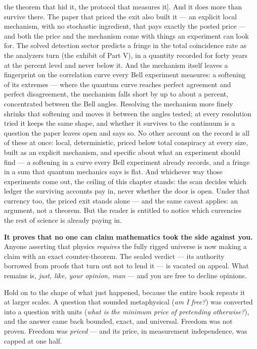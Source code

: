 \begin{ruled}
the theorem that hid it, the protocol that measures it{]}. And it does more than survive there. The paper that priced the exit also built it --- an explicit local mechanism, with no stochastic ingredient, that pays exactly the posted price --- and both the price and the mechanism come with things an experiment can look for. The solved detection sector predicts a fringe in the total coincidence rate as the analyzers turn (the exhibit of Part V), in a quantity recorded for forty years at the percent level and never below it. And the mechanism itself leaves a fingerprint on the correlation curve every Bell experiment measures: a softening of its extremes --- where the quantum curve reaches perfect agreement and perfect disagreement, the mechanism falls short by up to about a percent, concentrated between the Bell angles. Resolving the mechanism more finely shrinks that softening and moves it between the angles tested; at every resolution tried it keeps the same shape, and whether it survives to the continuum is a question the paper leaves open and says so. No other account on the record is all of these at once: local, deterministic, priced below total conspiracy at every size, built as an explicit mechanism, and specific about what an experiment should find --- a softening in a curve every Bell experiment already records, and a fringe in a sum that quantum mechanics says is flat. And whichever way those experiments come out, the ceiling of this chapter stands: the scan decides which ledger the surviving accounts pay in, never whether the door is open. Under that currency too, the priced
exit stands alone --- and the same caveat applies: an argument, not a
theorem. But the reader is entitled to notice which currencies the
rest of science is already paying in.

\end{ruled}

\textbf{It proves that no one can claim mathematics took the side against
you.} Anyone asserting that physics \emph{requires} the fully rigged
universe is now making a claim with an exact counter-theorem. The
sealed verdict --- its authority borrowed from proofs that turn out not
to lend it --- is vacated on appeal. What remains is, \emph{just, like, your opinion, man} --- and you are free
to decline opinions.

Hold on to the shape of what just happened, because the entire book
repeats it at larger scales. A question that sounded metaphysical
(\emph{am I free?}) was converted into a question with units (\emph{what is the
minimum price of pretending otherwise?}), and the answer came back
bounded, exact, and universal. Freedom was not proven. Freedom was
\emph{priced} --- and its price, in measurement independence, was capped at
one half.

